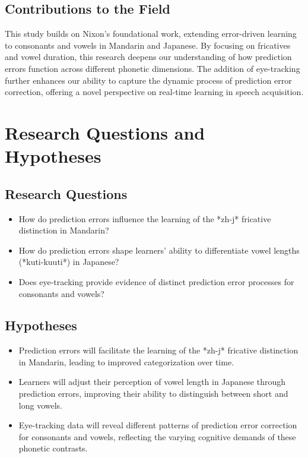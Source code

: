 \subsection{Contributions to the Field}

This study builds on Nixon's foundational work, extending error-driven learning to consonants and vowels in Mandarin and Japanese. By focusing on fricatives and vowel duration, this research deepens our understanding of how prediction errors function across different phonetic dimensions. The addition of eye-tracking further enhances our ability to capture the dynamic process of prediction error correction, offering a novel perspective on real-time learning in speech acquisition.

\section{Research Questions and Hypotheses}

\subsection{Research Questions}

\begin{itemize}
    \item How do prediction errors influence the learning of the *zh-j* fricative distinction in Mandarin?
    \item How do prediction errors shape learners' ability to differentiate vowel lengths (*kuti-kuuti*) in Japanese?
    \item Does eye-tracking provide evidence of distinct prediction error processes for consonants and vowels?
\end{itemize}

\subsection{Hypotheses}

\begin{itemize}
    \item Prediction errors will facilitate the learning of the *zh-j* fricative distinction in Mandarin, leading to improved categorization over time.
    \item Learners will adjust their perception of vowel length in Japanese through prediction errors, improving their ability to distinguish between short and long vowels.
    \item Eye-tracking data will reveal different patterns of prediction error correction for consonants and vowels, reflecting the varying cognitive demands of these phonetic contrasts.
\end{itemize}